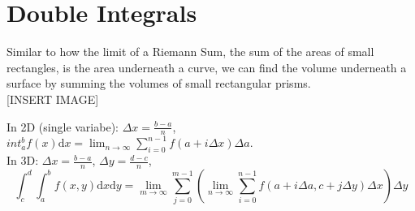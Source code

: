 \section{Double Integrals}
\noindent
Similar to how the limit of a Riemann Sum, the sum of the areas of small rectangles, is the area underneath a curve, we can find the volume underneath a surface by summing the volumes of small rectangular prisms.\\

[INSERT IMAGE]

\noindent
In 2D (single variabe): $\Delta x = \frac{b-a}{n}$, $int_{a}^{b}{f(x)\mathrm{d}x} = \lim_{n \to \infty}{\sum_{i = 0}^{n-1}{f(a+i\Delta x)\Delta a}}$.\\
In 3D: $\Delta x = \frac{b-a}{n}$, $\Delta y = \frac{d-c}{n}$,
\begin{equation*}
	\int_{c}^{d}{\int_{a}^{b}{f(x,y)\mathrm{d}x}\mathrm{d}y} = \lim_{m \to \infty}{\sum_{j = 0}^{m-1}{\left(\lim_{n \to \infty}{\sum_{i = 0}^{n-1}{f(a+i\Delta a, c+j\Delta y)\Delta x}}\right)\Delta y}}
\end{equation*}



